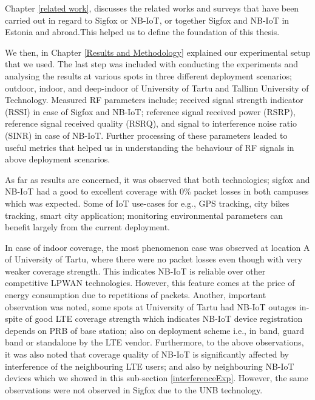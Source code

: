\documentclass[12pt]{article}
\begin{document}
Chapter \ref{related work}, discusses the related works and surveys that have been carried out in regard to Sigfox or NB-IoT, or together Sigfox and NB-IoT in Estonia and abroad.This helped us to define the foundation of this thesis.\par

We then, in Chapter \ref{Results and Methodology} explained our experimental setup that we used. The last step was included with conducting the experiments and analysing the results at various spots in three different deployment scenarios; outdoor, indoor, and deep-indoor of University of Tartu and Tallinn University of Technology. Measured RF parameters include; received signal strength indicator (RSSI) in case of Sigfox and NB-IoT; reference signal received power (RSRP), reference signal received quality (RSRQ), and signal to interference noise ratio (SINR) in case of NB-IoT. Further processing  of these parameters leaded to useful metrics that helped us in understanding the behaviour of RF signals in above deployment scenarios.

As far as results are concerned, it was observed that both technologies; sigfox and NB-IoT had a good to excellent coverage with 0\% packet losses in both campuses which was expected. Some of IoT use-cases for e.g., GPS tracking, city bikes tracking, smart city application; monitoring environmental parameters can benefit largely from the current deployment.\par

In case of indoor coverage, the most phenomenon case was observed at location A of University of Tartu, where there were no packet losses even though with very weaker coverage strength. This indicates NB-IoT is reliable over other competitive LPWAN technologies. However, this feature comes at the price of energy consumption due to repetitions of packets. Another, important observation was noted, some spots at University of Tartu had NB-IoT outages in-spite of good LTE coverage strength which indicates NB-IoT device registration depends on PRB of base station; also on deployment scheme i.e., in band, guard band or standalone by the LTE vendor. Furthermore, to the above observations, it was also noted that coverage quality of NB-IoT is significantly affected by interference of the neighbouring LTE users; and also by neighbouring NB-IoT devices which we showed in this sub-section \ref{interferenceExp}. However, the same observations were not observed in Sigfox due to the UNB technology.\par
\end{document}
